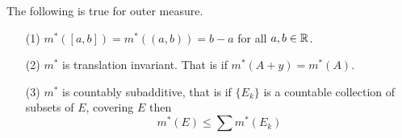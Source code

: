 \begin{theorem}\label{8.1.3}
    The following is true for outer measure.
    \begin{enumerate}
        \item[(1)] $m^*([a,b])=m^*((a,b))=b-a$ for all $a,b \in \mathbb{R}$.

        \item[(2)] $m^*$ is translation invariant. That is if $m^*(A+y)=m^*(A)$.

        \item[(3)] $m^*$ is countably subadditive, that is if $\{E_k\}$ is a
            countable collection of subsets of $E$, covering $E$ then
            \begin{equation}
                m^*(E) \leq \sum{m^*(E_k)}
            \end{equation}
    \end{enumerate}
\end{theorem}
